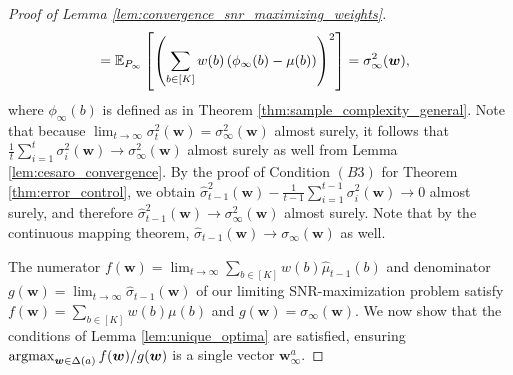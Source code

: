 \documentclass{article}
\begin{document}
\begin{appendices}
\begin{proof}[Proof of Lemma \ref{lem:convergence_snr_maximizing_weights}]
\begin{align}
 & = \mathbb{E}_{P_\infty}\left[ \left(\sum_{b \in [K]} w(b) \left( \phi_\infty(b) - \mu(b)\right) \right)^2\right] = \sigma_\infty^2(\boldsymbol{w}),\label{eq:variance_convergence}
\end{align}
where $\phi_\infty(b)$ is defined as in Theorem \ref{thm:sample_complexity_general}. Note that because $\lim_{t \rightarrow \infty} \sigma_t^2(\bm{w}) = \sigma_\infty^2(\bm{w})$ almost surely, it follows that $\frac{1}{t}\sum_{i=1}^t \sigma_i^2(\bm{w}) \rightarrow \sigma^2_\infty(\bm{w})$ almost surely as well from Lemma \ref{lem:cesaro_convergence}. By the proof of Condition $(B3)$ for Theorem \ref{thm:error_control}, we obtain $\hat\sigma^2_{t-1}(\bm{w}) - \frac{1}{t-1}\sum_{i=1}^{t-1}\sigma^2_i(\bm{w}) \rightarrow 0$ almost surely, and therefore $\hat\sigma^2_{t-1}(\bm{w}) \rightarrow \sigma_\infty^2(\bm{w})$ almost surely. Note that by the continuous mapping theorem, $\hat\sigma_{t-1}(\bm{w}) \rightarrow \sigma_\infty(\bm{w})$ as well. 

The numerator $f(\bm{w}) = \lim_{t \rightarrow \infty}\sum_{b \in [K]} w(b) \hat\mu_{t-1}(b)$ and denominator $g(\bm{w}) = \lim_{t \rightarrow \infty}\hat\sigma_{t-1}(\bm{w})$ of our limiting SNR-maximization problem satisfy $f(\bm{w}) = \sum_{b \in [K]}w(b) \mu(b)$ and $g(\bm{w}) = \sigma_\infty(\bm{w})$. We now show that the conditions of Lemma \ref{lem:unique_optima} are satisfied, ensuring $\argmax_{\bm{w}\in \Delta(a)} f(\bm{w})/ g(\bm{w})$ is a single vector $\bm{w}_\infty^a$. 


\end{proof}
\end{appendices}
\end{document}
